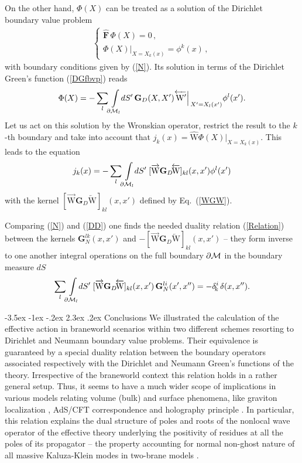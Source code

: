 \documentclass[a4paper,12pt]{article}
\makeatletter
\renewcommand\section{\@startsection {section}{1}{\z@}%
                                   {-3.5ex \@plus -1ex \@minus -.2ex}%
                                   {2.3ex \@plus.2ex}%
                                   {\normalfont\large\bfseries}}
\newcommand{\dM}{{\partial \cal M}}
\newcommand{\dS}{dS}
\newcommand{\BBox}{\hat{\mathbf{F}}}  %
\newcommand{\GrN}{\mathbf{G}_{N}}
\newcommand{\GrD}{\mathbf{G}_{D}}
\newcommand{\WGrDW}{\overrightarrow{\mathrm{W}}\mathbf{G}_{D}\!\overleftarrow{\mathrm{W}}}
\makeatother
\begin{document}
On the other hand, $\Phi(X)$ can be treated as a solution of the
Dirichlet boundary value problem
    \begin{eqnarray}
     \left\{ \begin{array}{l}
     \BBox \,\Phi(X)=0\,, \\
     \Phi(X) \big|_{X=X_k(x)}\!\!=\phi^k(x)\,,
     \end{array} \right.                       \label{Dbvp}
    \end{eqnarray}
with boundary conditions given by (\ref{N}). Its solution in
terms of the Dirichlet Green's function (\ref{DGfbvp}) reads
     \begin{eqnarray}
     \Phi(X)=-\sum_l\!\int\limits_{\dM_l}\!\!\dS'\,
     \GrD(X,X')\overleftarrow{\,{\mathrm{W}}'}
     \Big|_{\,X'=X_l(x')}\phi^l(x').      \label{DGenSol}
    \end{eqnarray}
Let us act on this solution by the Wronskian operator, restrict
the result to the $k$-th boundary and take into account that
$j_k(x)=\hat{\mathrm{W}} \Phi (X)|_{X=X_k(x)}$.  This leads to the
equation
    \begin{eqnarray}
     j_k(x)=-\sum_l\!\int \limits_{\dM_l}\!\!\dS'\;
     [\WGrDW]_{kl}(x,x')
     \phi^l(x')                           \label{DD}
    \end{eqnarray}
with the kernel $[\WGrDW]_{kl}(x,x')$ defined by Eq.~(\ref{WGW}).

Comparing (\ref{N}) and (\ref{DD}) one finds the needed duality
relation (\ref{Relation}) between the kernels $\GrN^{lk}(x,x')$
and $-[\WGrDW]_{kl}(x,x')\!$ -- they form inverse to one another
integral operations on the full boundary $\dM$ in the boundary
measure $\dS$
    \begin{eqnarray}
     \sum_l\!\int \limits_{\dM_l}\!\!\dS'\;
     [\WGrDW]_{kl}(x,x')\,
     {\mathbf G}_N^{li}(x',x'')=
     -\delta^{i}_{\!k}\,\delta(x,x'').         \label{D}
    \end{eqnarray}

\section{Conclusions}
\hspace{\parindent}
We illustrated the calculation of the effective action in
braneworld scenarios  within two different schemes resorting to
Dirichlet and Neumann boundary value problems. Their equivalence
is guaranteed by a special duality relation between the boundary
operators associated respectively with the Dirichlet and Neumann
Green's functions of the theory. Irrespective of the braneworld
context this relation holds in a rather general setup. Thus, it
seems to have a much wider scope of implications in various models
relating volume (bulk) and surface phenomena, like graviton
localization \cite{RS}, AdS/CFT correspondence and holography
principle \cite{BalKraLa}. In particular, this relation explains
the dual structure of poles and roots of the nonlocal wave operator
of the effective theory underlying the positivity of residues at
all the poles of its propagator -- the property accounting for
normal non-ghost nature of all massive Kaluza-Klein modes in
two-brane models \cite{BWEA,nlbwa}.
\end{document}
